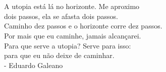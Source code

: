 \chapter*{}
\vfill
\begin{flushright}
A utopia está lá no horizonte. Me aproximo \\
dois passos, ela se afasta dois passos.\\
Caminho dez passos e o horizonte corre dez passos.\\
Por mais que eu caminhe, jamais alcançarei.\\
Para que serve a utopia? Serve para isso:\\
para que eu não deixe de caminhar.\\
- Eduardo Galeano
\end{flushright}
